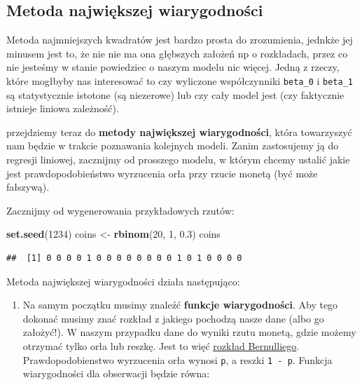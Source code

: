 \documentclass[
]{article}
\newenvironment{Shaded}{\begin{snugshade}}{\end{snugshade}}
\newcommand{\DecValTok}[1]{\textcolor[rgb]{0.00,0.00,0.81}{#1}}
\newcommand{\FloatTok}[1]{\textcolor[rgb]{0.00,0.00,0.81}{#1}}
\newcommand{\KeywordTok}[1]{\textcolor[rgb]{0.13,0.29,0.53}{\textbf{#1}}}
\newcommand{\NormalTok}[1]{#1}
\newcommand{\StringTok}[1]{\textcolor[rgb]{0.31,0.60,0.02}{#1}}
\providecommand{\tightlist}{%
  \setlength{\itemsep}{0pt}\setlength{\parskip}{0pt}}
\begin{document}
\newpage

\hypertarget{metoda-najwiux119kszej-wiarygodnoux15bci}{%
\subsection{Metoda największej
wiarygodności}\label{metoda-najwiux119kszej-wiarygodnoux15bci}}

Metoda najmniejszych kwadratów jest bardzo prosta do zrozumienia,
jednkże jej minusem jest to, że nie nie ma ona głębszych założeń np o
rozkładach, przez co nie jesteśmy w stanie powiedziec o naszym modelu
nic więcej. Jedną z rzeczy, które mogłbyby nas interesować to czy
wyliczone współczynniki \texttt{beta\_0} i \texttt{beta\_1} są
statystycznie istotone (są niezerowe) lub czy cały model jest (czy
faktycznie istnieje liniowa zależność).

przejdziemy teraz do \textbf{metody największej wiarygodności}, która
towarzyszyć nam będzie w trakcie poznawania kolejnych modeli. Zanim
zastosujemy ją do regresji liniowej, zacznijmy od prosszego modelu, w
którym chcemy ustalić jakie jest prawdopodobieństwo wyrzucenia orła przy
rzucie monetą (być może fałszywą).

Zacznijmy od wygenerowania przykładowych rzutów:

\begin{Shaded}
\begin{Highlighting}[]
\KeywordTok{set.seed}\NormalTok{(}\DecValTok{1234}\NormalTok{)}
\NormalTok{coins \textless{}{-}}\StringTok{ }\KeywordTok{rbinom}\NormalTok{(}\DecValTok{20}\NormalTok{, }\DecValTok{1}\NormalTok{, }\FloatTok{0.3}\NormalTok{)}
\NormalTok{coins}
\end{Highlighting}
\end{Shaded}

\begin{verbatim}
##  [1] 0 0 0 0 1 0 0 0 0 0 0 0 0 1 0 1 0 0 0 0
\end{verbatim}

Metoda największej wiarygodności działa następująco:

\begin{enumerate}
\def\labelenumi{\arabic{enumi}.}
\tightlist
\item
  Na samym początku musimy znaleźć \textbf{funkcje wiarygodności}. Aby
  tego dokonać musimy znać rozkład z jakiego pochodzą nasze dane (albo
  go założyć!). W naszym przypadku dane do wyniki rzutu monetą, gdzie
  możemy otrzymać tylko orła lub reszkę. Jest to więć
  \href{https://pl.wikipedia.org/wiki/Rozk\%C5\%82ad_zero-jedynkowy}{rozkład
  Bernulliego}. Prawdopodobienstwo wyrzucenia orła wynosi \texttt{p}, a
  reszki \texttt{1\ -\ p}. Funkcja wiarygodności dla obserwacji będzie
  równa:
\end{enumerate}
\end{document}
